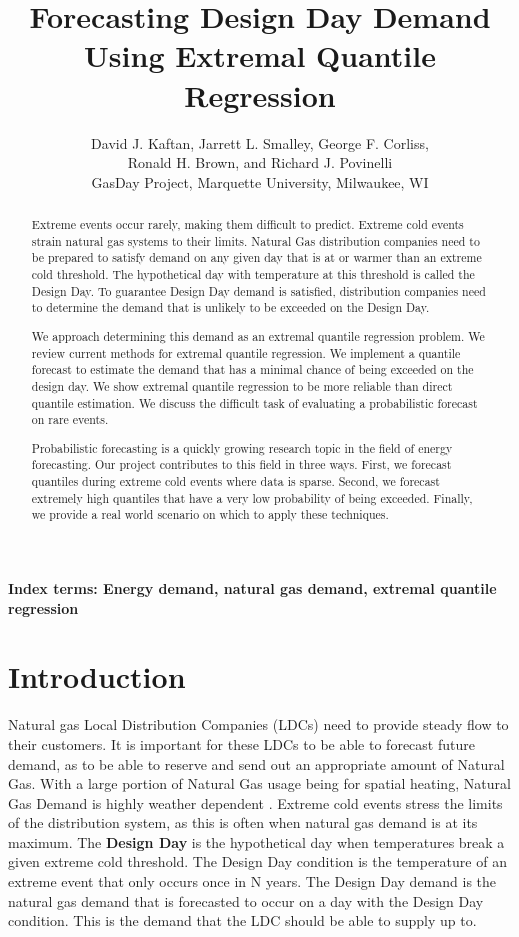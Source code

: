 \documentclass{article}
\title{Forecasting Design Day Demand Using Extremal Quantile Regression}
\author{David J. Kaftan, Jarrett L. Smalley, George F. Corliss, \\
Ronald H. Brown, and Richard J. Povinelli \\
GasDay Project, Marquette University, Milwaukee, WI
}
\date{}
\begin{document}
\maketitle

\begin{abstract}
Extreme events occur rarely, making them difficult to predict. Extreme cold events strain natural gas systems to their limits. Natural Gas distribution companies need to be prepared to satisfy demand on any given day that is at or warmer than an extreme cold threshold. The hypothetical day with temperature at this threshold is called the Design Day. To guarantee Design Day demand is satisfied, distribution companies need to determine the demand that is unlikely to be exceeded on the Design Day.

We approach determining this demand as an extremal quantile regression problem. We review current methods for extremal quantile regression. We implement a quantile forecast to estimate the demand that has a minimal chance of being exceeded on the design day. We show extremal quantile regression to be more reliable than direct quantile estimation. We discuss the difficult task of evaluating a probabilistic forecast on rare events.

Probabilistic forecasting is a quickly growing research topic in the field of energy forecasting. Our project contributes to this field in three ways. First, we forecast quantiles during extreme cold events where data is sparse. Second, we forecast extremely high quantiles that have a very low probability of being exceeded. Finally, we provide a real world scenario on which to apply these techniques.    
\end{abstract} 

{\bf Index terms: Energy demand, natural gas demand, extremal quantile regression}

\section{Introduction}
Natural gas Local Distribution Companies (LDCs) need to provide steady flow to their customers. It is important for these LDCs to be able to forecast future demand, as to be able to reserve and send out an appropriate amount of Natural Gas. With a large portion of Natural Gas usage being for spatial heating, Natural Gas Demand is highly weather dependent \cite{vitullo2009mathematical}. Extreme cold events stress the limits of the distribution system, as this is often when natural gas demand is at its maximum. The \textbf{Design Day} is the hypothetical day when temperatures break a given extreme cold threshold. The Design Day condition is the temperature of an extreme event that only occurs once in N years. The Design Day demand is the natural gas demand that is forecasted to occur on a day with the Design Day condition. This is the demand that the LDC should be able to supply up to. 
\end{document}
